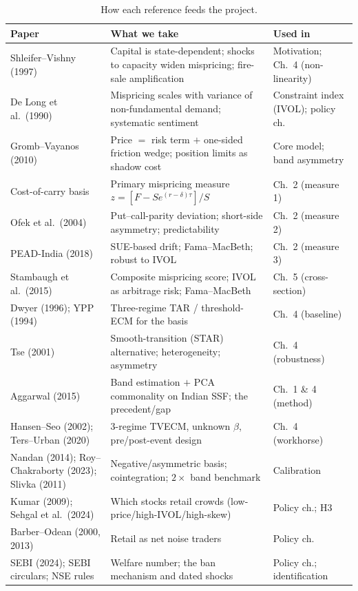 \begin{table}[h]
\centering\small
\renewcommand{\arraystretch}{1.2}
\begin{tabular}{@{}p{} p{} p{}@{}}
\toprule
\textbf{Paper} & \textbf{What we take} & \textbf{Used in} \\
\midrule
Shleifer--Vishny (1997) & Capital is state-dependent; shocks to capacity widen mispricing; fire-sale amplification & Motivation; Ch.\ 4 (non-linearity) \\
De Long et al.\ (1990) & Mispricing scales with variance of non-fundamental demand; systematic sentiment & Constraint index (IVOL); policy ch. \\
Gromb--Vayanos (2010) & Price $=$ risk term $+$ one-sided friction wedge; position limits as shadow cost & Core model; band asymmetry \\
Cost-of-carry basis & Primary mispricing measure $z=[F-Se^{(r-\delta)\tau}]/S$ & Ch.\ 2 (measure 1) \\
Ofek et al.\ (2004) & Put--call-parity deviation; short-side asymmetry; predictability & Ch.\ 2 (measure 2) \\
PEAD-India (2018) & SUE-based drift; Fama--MacBeth; robust to IVOL & Ch.\ 2 (measure 3) \\
Stambaugh et al.\ (2015) & Composite mispricing score; IVOL as arbitrage risk; Fama--MacBeth & Ch.\ 5 (cross-section) \\
Dwyer (1996); YPP (1994) & Three-regime TAR / threshold-ECM for the basis & Ch.\ 4 (baseline) \\
Tse (2001) & Smooth-transition (STAR) alternative; heterogeneity; asymmetry & Ch.\ 4 (robustness) \\
Aggarwal (2015) & Band estimation $+$ PCA commonality on Indian SSF; the precedent/gap & Ch.\ 1 \& 4 (method) \\
Hansen--Seo (2002); Ters--Urban (2020) & 3-regime TVECM, unknown $\beta$, pre/post-event design & Ch.\ 4 (workhorse) \\
Nandan (2014); Roy--Chakraborty (2023); Slivka (2011) & Negative/asymmetric basis; cointegration; $2\times$ band benchmark & Calibration \\
Kumar (2009); Sehgal et al.\ (2024) & Which stocks retail crowds (low-price/high-IVOL/high-skew) & Policy ch.; H3 \\
Barber--Odean (2000, 2013) & Retail as net noise traders & Policy ch. \\
SEBI (2024); SEBI circulars; NSE rules & Welfare number; the ban mechanism and dated shocks & Policy ch.; identification \\
\bottomrule
\end{tabular}
\caption{How each reference feeds the project.}
\label{tab:map}
\end{table}

